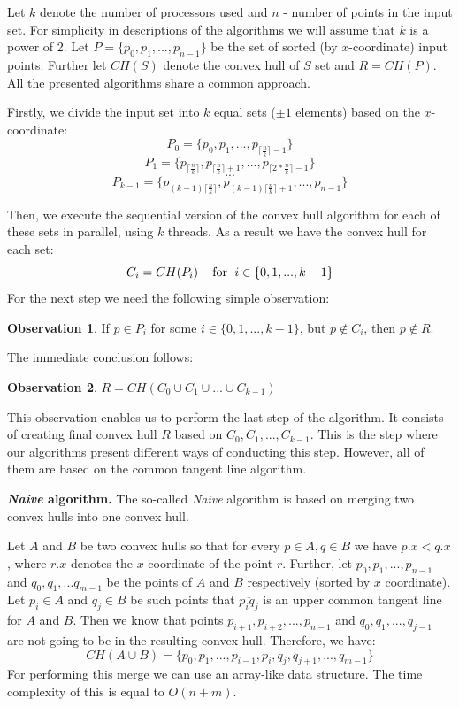 \documentclass[letterpaper]{article}
\newcommand{\mypar}[1]{{\bf #1.}}
\theoremstyle{definition}
\newtheorem{observation}{Observation}
\begin{document}
Let $k$ denote the number of processors used and $n$ - number of points in the input set.
For simplicity in descriptions of the algorithms we will assume that $k$ is a power of 2. 
Let $P = \{p_0, p_1, ..., p_{n-1} \}$ be the set of sorted (by $x$-coordinate) input points.
Further let $CH(S)$ denote the convex hull of $S$ set and $R=CH(P)$.
All the presented algorithms share a common approach.

Firstly, we divide the input set into $k$ equal sets ($\pm 1$ elements) based on the $x$-coordinate:
$$P_0 = \{p_0, p_1, ..., p_{\lceil{\frac{n}{k}}\rceil - 1}\}$$
$$P_1 = \{p_{\lceil{\frac{n}{k}}\rceil}, p_{\lceil{\frac{n}{k}}\rceil + 1}, ..., p_{\lceil{2 * \frac{n}{k}}\rceil - 1}\}$$
$$...$$
$$P_{k-1} = \{p_{(k-1)\lceil{\frac{n}{k}}\rceil}, p_{(k-1)\lceil{\frac{n}{k}}\rceil + 1}, ..., p_{n- 1} \}$$

Then, we execute the sequential version of the convex hull algorithm for each of these sets in parallel, using $k$ threads.
As a result we have the convex hull for each set:
$$C_i = CH(P_i) \textrm{\;\;\; for \;} i \in \{0, 1, ..., k - 1\}$$
For the next step we need the following simple observation:
\begin{observation}
If $p \in P_i$ for some $i \in \{0, 1, ..., k - 1\}$, but $p \notin C_i$, then $p \notin R$.
\end{observation}

The immediate conclusion follows:
\begin{observation}
$R = CH(C_0 \cup C_1 \cup ... \cup C_{k - 1})$
\end{observation}

This observation enables us to perform the last step of the algorithm.
It consists of creating final convex hull $R$ based on $C_0, C_1, ..., C_{k - 1}$.
This is the step where our algorithms present different ways of conducting this step.
However, all of them are based on the common tangent line algorithm.

\mypar{{\it Naive} algorithm}
The so-called \textit{Naive} algorithm is based on merging two convex hulls into one convex hull.

Let $A$ and $B$ be two convex hulls so that for every $p \in A, q \in B$ we have $p.x < q.x$, where $r.x$ denotes the $x$ coordinate of the point $r$.
Further, let $p_0, p_1, ..., p_{n-1}$ and $q_0, q_1, ... q_{m-1}$ be the points of $A$ and $B$ respectively (sorted by $x$ coordinate).
Let $p_i \in A$ and $q_j \in B$ be such points that $\overline{p_iq_j}$ is an upper common tangent line for $A$ and $B$.
Then we know that points $p_{i+1}, p_{i + 2}, ..., p_{n - 1}$ and $q_0, q_1, ..., q_{j -1}$ are not going to be in the resulting convex hull.
Therefore, we have:
$$CH(A \cup B) = \{ p_0, p_1, ..., p_{i - 1}, p_i, q_j, q_{j + 1}, ..., q_{m - 1} \}$$
For performing this merge we can use an array-like data structure.
The time complexity of this is equal to $O(n + m)$.
\end{document}
